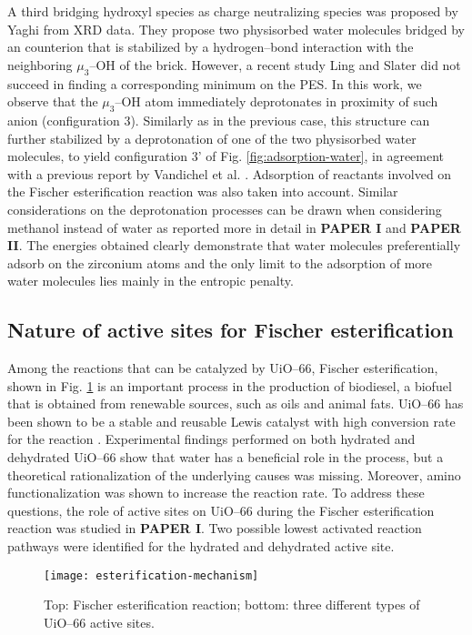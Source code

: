 A third bridging hydroxyl species as charge neutralizing species was proposed by Yaghi \cite{trickett2015definitive} from XRD data. They propose two physisorbed water molecules bridged by an  counterion that is stabilized by a hydrogen--bond interaction with the neighboring $\mu_3$--OH of the brick. However, a recent study Ling and Slater \cite{ling2016dynamic} did not succeed in finding a corresponding minimum on the PES. In this work, we observe that the $\mu_3$--OH atom immediately deprotonates in proximity of such  anion (configuration 3). Similarly as in the previous case, this structure can further stabilized by a deprotonation of one of the two physisorbed water molecules, to yield configuration 3’ of Fig. \ref{fig:adsorption-water}, in agreement with a previous report by Vandichel et al. \cite{vandichel2016water}. Adsorption of reactants involved on the Fischer esterification reaction was also taken into account. Similar considerations on the deprotonation processes can be drawn when considering methanol instead of water as reported more in detail in \textbf{PAPER I} and \textbf{PAPER II}. The energies obtained clearly demonstrate that water molecules preferentially adsorb on the zirconium atoms and the only limit to the adsorption of more water molecules lies mainly in the entropic penalty. 

\subsection*{Nature of active sites for Fischer esterification}
 Among the reactions that can be catalyzed by UiO--66, Fischer esterification, shown in Fig. \ref{fig:esterification-mechanism} is an important process in the production of biodiesel, a biofuel that is obtained from renewable sources, such as oils and animal fats. UiO--66 has been shown to be a stable and reusable Lewis catalyst with high conversion rate for the reaction \cite{cirujano2015conversion, cirujano2015zirconium}. Experimental findings performed on both hydrated and dehydrated UiO--66 show that water has a beneficial role in the process, but a theoretical rationalization of the underlying causes was missing. Moreover, amino functionalization was shown to increase the reaction rate. To address these questions, the role of active sites on UiO--66 during the Fischer esterification reaction was studied in \textbf{PAPER I}. Two possible lowest activated reaction pathways were identified for the hydrated and dehydrated active site.
\begin{figure}[!htbp]
	\centering
	\texttt{[image: esterification-mechanism]}
	\caption{Top: Fischer esterification reaction; bottom: three different types of UiO--66 active sites.}
	\label{fig:esterification-mechanism}
\end{figure}

